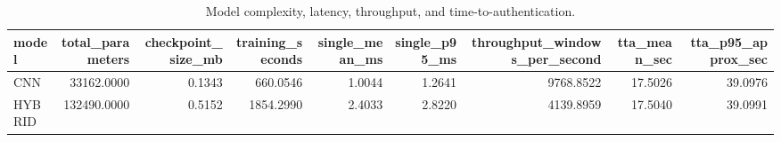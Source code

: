 \begin{table}
\caption{Model complexity, latency, throughput, and time-to-authentication.}
\label{tab:stage51_cost}
\begin{tabular}{lrrrrrrrr}
\toprule
model & total\_parameters & checkpoint\_size\_mb & training\_seconds & single\_mean\_ms & single\_p95\_ms & throughput\_windows\_per\_second & tta\_mean\_sec & tta\_p95\_approx\_sec \\
\midrule
CNN & 33162.0000 & 0.1343 & 660.0546 & 1.0044 & 1.2641 & 9768.8522 & 17.5026 & 39.0976 \\
HYBRID & 132490.0000 & 0.5152 & 1854.2990 & 2.4033 & 2.8220 & 4139.8959 & 17.5040 & 39.0991 \\
\bottomrule
\end{tabular}
\end{table}
